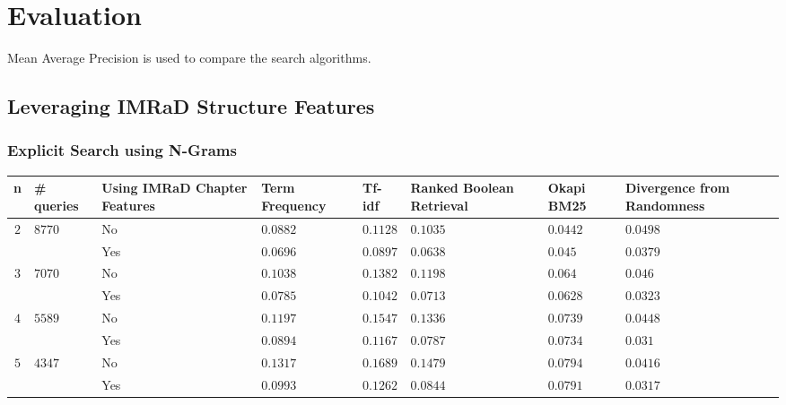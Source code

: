 \chapter{Evaluation}
\label{cha:evaluation}
Mean Average Precision is used to compare the search algorithms.

\section{Leveraging IMRaD Structure Features}

\subsection{Explicit Search using N-Grams}

\begin{table}[b]
  \begin{adjustwidth}{-2cm}{}
    \begin{tabular}{ c C{1.5cm} C{2.1cm} C{2.1cm} C{2.1cm} C{2.1cm} C{2.1cm} C{2.1cm} }
      \toprule
      \textbf{n} & \textbf{\# queries} & \textbf{Using IMRaD Chapter Features} & \textbf{Term Frequency} & \textbf{Tf-idf} & \textbf{Ranked Boolean Retrieval} & \textbf{Okapi BM25} & \textbf{Divergence from Randomness} \\ \midrule
       &  & No  & $0.0882$ & $0.1128$ & $0.1035$ & $0.0442$ & $0.0498$  \\
                                                    && Yes & $0.0696$ & $0.0897$ & $0.0638$ & $0.045$  & $0.0379$  \\ \midrule
       &  & No  & $0.1038$ & $0.1382$ & $0.1198$ & $0.064$  & $0.046$   \\
                                                    && Yes & $0.0785$ & $0.1042$ & $0.0713$ & $0.0628$ & $0.0323$  \\ \midrule
       &  & No  & $0.1197$ & $0.1547$ & $0.1336$ & $0.0739$ & $0.0448$  \\
                                                    && Yes & $0.0894$ & $0.1167$ & $0.0787$ & $0.0734$ & $0.031$   \\ \midrule
       &  & No  & $0.1317$ & $0.1689$ & $0.1479$ & $0.0794$ & $0.0416$  \\
                                                    && Yes & $0.0993$ & $0.1262$ & $0.0844$ & $0.0791$ & $0.0317$  \\ \midrule

\end{tabular}
\end{adjustwidth}
\end{table}
